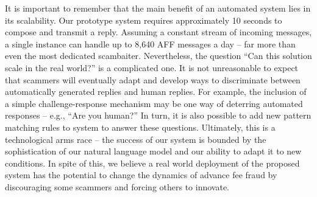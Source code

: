 It is important to remember that the main benefit of an automated system lies in its scalability. Our prototype system requires approximately 10 seconds to compose and transmit a reply. Assuming a constant stream of incoming messages, a single instance can handle up to 8,640 AFF messages a day -- far more than even the most dedicated scambaiter. Nevertheless, the question ``Can this solution scale in the real world?'' is a complicated one. It is not unreasonable to expect that scammers will eventually adapt and develop ways to discriminate between automatically generated replies and human replies. For example, the inclusion of a simple challenge-response mechanism may be one way of deterring automated responses -- e.g., ``Are you human?'' In turn, it is also possible to add new pattern matching rules to system to answer these questions. Ultimately, this is a technological arms race -- the success of our system is bounded by the sophistication of our natural language model and our ability to adapt it to new conditions. In spite of this, we believe a real world deployment of the proposed system has the potential to change the dynamics of advance fee fraud by discouraging some scammers and forcing others to innovate.
